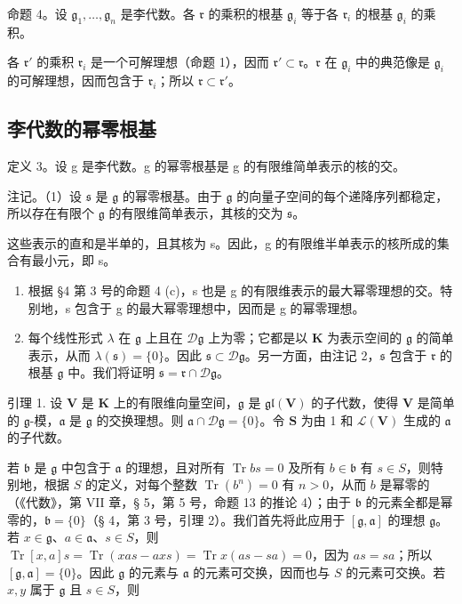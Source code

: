 命题 4。设 \(\mathfrak{g}_1, \ldots, \mathfrak{g}_n\) 是李代数。各 \(\mathfrak{r}\) 的乘积的根基 \(\mathfrak{g}_i\) 等于各 \(\mathfrak{r}_i\) 的根基 \(\mathfrak{g}_i\) 的乘积。

各 \(\mathfrak{r}'\) 的乘积 \(\mathfrak{r}_i\) 是一个可解理想（命题 1），因而 \(\mathfrak{r}' \subset \mathfrak{r}\)。\(\mathfrak{r}\) 在 \(\mathfrak{g}_i\) 中的典范像是 \(\mathfrak{g}_i\) 的可解理想，因而包含于 \(\mathfrak{r}_i\)；所以 \(\mathfrak{r} \subset \mathfrak{r}'\)。

\subsection{李代数的幂零根基}

定义 3。设 g 是李代数。g 的幂零根基是 g 的有限维简单表示的核的交。

注记。（1）设 \(\mathfrak{s}\) 是 \(\mathfrak{g}\) 的幂零根基。由于 \(\mathfrak{g}\) 的向量子空间的每个递降序列都稳定，所以存在有限个 \(\mathfrak{g}\) 的有限维简单表示，其核的交为 \(\mathfrak{s}\)。

这些表示的直和是半单的，且其核为 s。因此，g 的有限维半单表示的核所成的集合有最小元，即 s。

\begin{enumerate}
\def\labelenumi{(\arabic{enumi})}
\setcounter{enumi}{1}
\item
  根据 §4 第 3 号的命题 4 (c)，s 也是 g 的有限维表示的最大幂零理想的交。特别地，s 包含于 g 的最大幂零理想中，因而是 g 的幂零理想。
\item
  每个线性形式 \(\lambda\) 在 \(\mathfrak{g}\) 上且在 \(\mathcal{D}\mathfrak{g}\) 上为零；它都是以 \(\mathbf{K}\) 为表示空间的 \(\mathfrak{g}\) 的简单表示，从而 \(\lambda (\mathfrak{s}) = \{0\}\)。因此 \(\mathfrak{s} \subset \mathcal{D}\mathfrak{g}\)。另一方面，由注记 2，\(\mathfrak{s}\) 包含于 \(\mathfrak{r}\) 的根基 \(\mathfrak{g}\) 中。我们将证明 \(\mathfrak{s} = \mathfrak{r} \cap \mathcal{D}\mathfrak{g}\)。
\end{enumerate}

引理 1. 设 \(\mathbf{V}\) 是 \(\mathbf{K}\) 上的有限维向量空间，\(\mathfrak{g}\) 是 \(\mathfrak{gl}(\mathbf{V})\) 的子代数，使得 \(\mathbf{V}\) 是简单的 \(\mathfrak{g}\)-模，\(\mathfrak{a}\) 是 \(\mathfrak{g}\) 的交换理想。则 \(\mathfrak{a} \cap \mathcal{D}\mathfrak{g} = \{0\}\)。令 \(\mathbf{S}\) 为由 1 和 \(\mathcal{L}(\mathbf{V})\) 生成的 \(\mathfrak{a}\) 的子代数。

若 \(\mathfrak{b}\) 是 \(\mathfrak{g}\) 中包含于 \(\mathfrak{a}\) 的理想，且对所有 \(\operatorname{Tr}bs = 0\) 及所有 \(b\in \mathfrak{b}\) 有 \(s\in S\)，则特别地，根据 \(S\) 的定义，对每个整数 \(\operatorname{Tr}(b^n) = 0\) 有 \(n > 0\)，从而 \(b\) 是幂零的（《代数》，第 VII 章，§ 5，第 5 号，命题 13 的推论 4）；由于 \(\mathfrak{b}\) 的元素全都是幂零的，\(\mathfrak{b} = \{0\}\)（§ 4，第 3 号，引理 2）。我们首先将此应用于 \([\mathfrak{g},\mathfrak{a}]\) 的理想 \(\mathfrak{g}\)。若 \(x\in \mathfrak{g}\)、\(a\in \mathfrak{a}\)、\(s\in S\)，则 \(\operatorname{Tr}[x,a]s = \operatorname{Tr}(xas - axs) = \operatorname{Tr}x(as - sa) = 0\)，因为 \(as = sa\)；所以 \([\mathfrak{g},\mathfrak{a}] = \{0\}\)。因此 \(\mathfrak{g}\) 的元素与 \(\mathfrak{a}\) 的元素可交换，因而也与 \(S\) 的元素可交换。若 \(x,y\) 属于 \(\mathfrak{g}\) 且 \(s\in S\)，则


